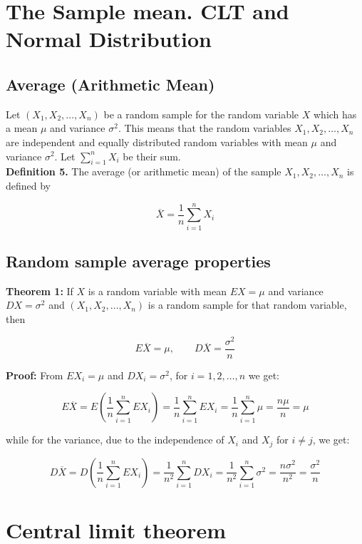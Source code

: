 \documentclass[a4paper, 12pt]{article}
\begin{document}
\section{The Sample mean. CLT and Normal Distribution}

\subsection{Average (Arithmetic Mean)}

Let $(X_1, X_2, \dots ,X_n)$ be a random sample for the random variable $X$ which has a mean $\mu$ and variance $\sigma^2$. This means that the random variables $X_1, X_2, \dots ,X_n$ are independent and equally distributed random variables with mean $\mu$ and variance $\sigma^2$. Let $\displaystyle\sum_{i=1}^{n}X_i$ be their sum.\\

\textbf{Definition 5.} The average (or arithmetic mean) of the sample $X_1, X_2, \dots, X_n$ is defined by

\[ \overline{X} = \frac{1}{n}\sum_{i=1}^{n}X_i \]

\subsection{Random sample average properties}

\textbf{Theorem 1:} If $X$ is a random variable with mean $EX = \mu$ and variance $DX = \sigma^2$ and $(X_1, X_2, \dots ,X_n)$ is a random sample for that random variable, then

\[ E\overline{X} = \mu, \quad \quad D\overline{X} = \frac{\sigma^2}{n} \]


\textbf{Proof:} From $EX_i = \mu$ and $DX_i=\sigma^2$, for $i=1,2,\dots,n$ we get:


\[ E\overline{X} = E\left( \frac{1}{n}\sum_{i=1}^{n}EX_i \right) = \frac{1}{n}\sum_{i=1}^{n}EX_i = \frac{1}{n}\sum_{i=1}^{n}\mu = \frac{n\mu}{n} = \mu  \]

while for the variance, due to the independence of $X_i$ and $X_j$ for $i\neq j$, we get:

\[ D\overline{X} = D\left( \frac{1}{n}\sum_{i=1}^{n}EX_i \right) = \frac{1}{n^2}\sum_{i=1}^{n}DX_i  = \frac{1}{n^2}\sum_{i=1}^{n}\sigma^2 = \frac{n\sigma^2}{n^2} = \frac{\sigma^2}{n} \]



\newpage
\section{Central limit theorem}
\end{document}
